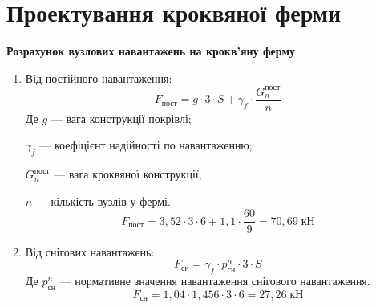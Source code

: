 \documentclass[a4paper,14pt]{article}
\begin{document}
\section{Проектування кроквяної ферми}
\textbf{Розрахунок вузлових навантажень на крокв'яну ферму}
\begin{enumerate}
    \item Від постійного навантаження:
        \begin{equation}
            F_{\textit{пост}} = g \cdot 3 \cdot S + \gamma_f \cdot \dfrac{G_n^{\textit{пост}}}{n}
        \end{equation}
        Де $g$ --- вага конструкції покрівлі;

        $\gamma_f$ --- коефіцієнт надійності по навантаженню;

        $G_n^{\textit{пост}}$ --- вага кроквяної конструкції;

        $n$ --- кількість вузлів у фермі.
        $$F_{\textit{пост}} = 3,52 \cdot 3 \cdot 6 + 1,1 \cdot \dfrac{60}{9} = 70,69\;\textit{кН}$$
    \item Від снігових навантажень:
        \begin{equation}
            F_{\textit{сн}} = \gamma_f \cdot p_{\textit{сн}}^n \cdot 3 \cdot S
        \end{equation}
        Де $p_{\textit{сн}}^n$ --- нормативне значення навантаження снігового навантаження.
        $$F_{\textit{сн}} = 1,04 \cdot 1,456 \cdot 3 \cdot 6 = 27,26\;\textit{кН}$$
\end{enumerate}
\end{document}

